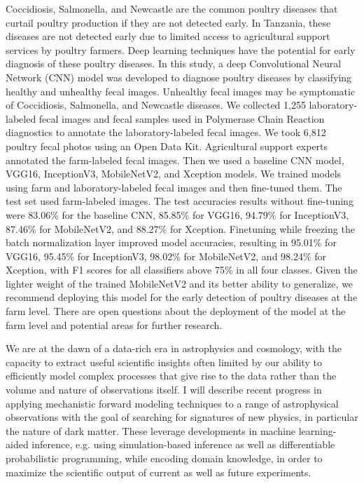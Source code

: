 \license

Coccidiosis, Salmonella, and Newcastle are the common poultry diseases that curtail poultry production if they are not detected early. In Tanzania, these diseases are not detected early due to limited access to agricultural support services by poultry farmers. Deep learning techniques have the potential for early diagnosis of these poultry diseases. In this study, a deep Convolutional Neural Network (CNN) model was developed to diagnose poultry diseases by classifying healthy and unhealthy fecal images. Unhealthy fecal images may be symptomatic of Coccidiosis, Salmonella, and Newcastle diseases. We collected 1,255 laboratory-labeled fecal images and fecal samples used in Polymerase Chain Reaction diagnostics to annotate the laboratory-labeled fecal images. We took 6,812 poultry fecal photos using an Open Data Kit. Agricultural support experts annotated the farm-labeled fecal images. Then we used a baseline CNN model, VGG16, InceptionV3, MobileNetV2, and Xception models. We trained models using farm and laboratory-labeled fecal images and then fine-tuned them. The test set used farm-labeled images. The test accuracies results without fine-tuning were 83.06\% for the baseline CNN, 85.85\% for VGG16, 94.79\% for InceptionV3, 87.46\% for MobileNetV2, and 88.27\% for Xception. Finetuning while freezing the batch normalization layer improved model accuracies, resulting in 95.01\% for VGG16, 95.45\% for InceptionV3, 98.02\% for MobileNetV2, and 98.24\% for Xception, with F1 scores for all classifiers above 75\% in all four classes. Given the lighter weight of the trained MobileNetV2 and its better ability to generalize, we recommend deploying this model for the early detection of poultry diseases at the farm level. There are open questions about the deployment of the model at the farm level and potential areas for further research.

\license

We are at the dawn of a data-rich era in astrophysics and cosmology, with the capacity to extract useful scientific insights often limited by our ability to efficiently model complex processes that give rise to the data rather than the volume and nature of observations itself. I will describe recent progress in applying mechanistic forward modeling techniques to a range of astrophysical observations with the goal of searching for signatures of new physics, in particular the nature of dark matter. These leverage developments in machine learning-aided inference, e.g. using simulation-based inference as well as differentiable probabilistic programming, while encoding domain knowledge, in order to maximize the scientific output of current as well as future experiments.

